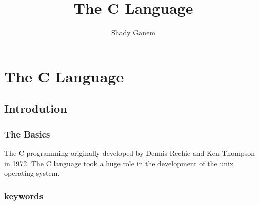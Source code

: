 \documentclass{book}
\title{The C Language}
\author{Shady Ganem}
\begin{document}
\maketitle
\tableofcontents

\part{The C Language}
\chapter{Introdution}
\section{The Basics}
The C programming originally developed by Dennis Rechie and Ken Thompson in 1972. The C language took a huge 
role in the development of the unix operating system.
\section{keywords}
\end{document}
